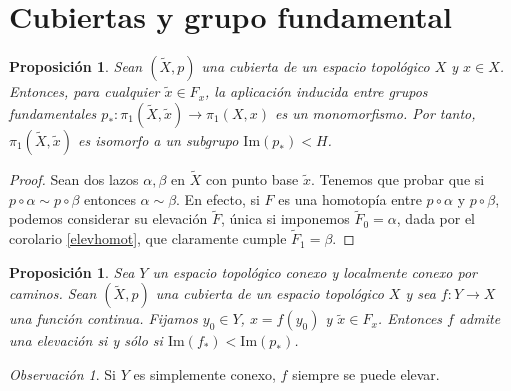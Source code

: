\documentclass[12pt,a4paper]{book}
\newtheorem{prop}[thm]{Proposición}
\theoremstyle{definition} \newtheorem{defn}[thm]{Definición}
\theoremstyle{definition} \newtheorem{ejemplo}[thm]{Ejemplo}
\theoremstyle{definition} \newtheorem{ejercicio}[thm]{Ejercicio}
\theoremstyle{remark} \newtheorem*{obs}{Observación}
\def\gf{\pi_1}
\def\XX{\tilde{X}}
\def\xx{\tilde{x}}
\def\im{\mathrm{Im}}
\begin{document}
\section{Cubiertas y grupo fundamental}
\begin{prop}
  Sean $(\XX,p)$ una cubierta de un espacio topológico $X$ y $x\in X$. Entonces, para cualquier $\xx \in F_x$, la aplicación inducida entre grupos fundamentales $p_*:\gf(\XX,\xx)\rightarrow \gf(X,x)$ es un monomorfismo. Por tanto, $\gf(\XX,\xx)$ es isomorfo a un subgrupo $\im(p_*)<H$.
\end{prop}
\begin{proof}
  Sean dos lazos $\alpha, \beta$ en $\XX$ con punto base $\xx$. Tenemos que probar que si $p\circ \alpha \sim p\circ \beta$ entonces $\alpha \sim \beta$. En efecto, si $F$ es una homotopía entre $p\circ \alpha$ y $p\circ \beta$, podemos considerar su elevación $\tilde{F}$, única si imponemos $\tilde{F}_0=\alpha$, dada por el corolario \ref{elevhomot}, que claramente cumple $\tilde{F}_1=\beta$.
\end{proof}
\begin{prop}
  Sea $Y$ un espacio topológico conexo y localmente conexo por caminos. Sean $(\XX,p)$ una cubierta de un espacio topológico $X$ y sea $f:Y\rightarrow X$ una función continua. Fijamos $y_0\in Y$, $x=f(y_0)$ y $\xx \in F_x$. Entonces $f$ admite una elevación si y sólo si
 $\im (f_*) < \im (p_*)$.   
\end{prop}

\begin{obs}
  Si $Y$ es simplemente conexo, $f$ siempre se puede elevar.
\end{obs}
\end{document}
